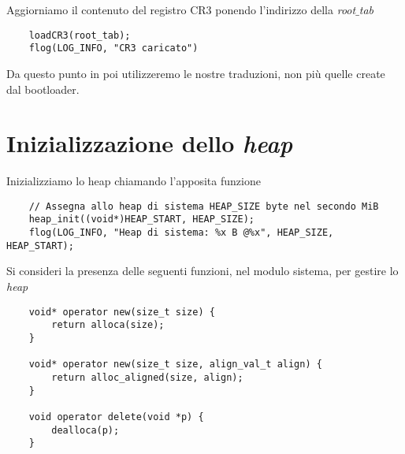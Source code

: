 Aggiorniamo il contenuto del registro CR3 ponendo l'indirizzo della \emph{root$\_$tab}
\begin{verbatim}
	loadCR3(root_tab);
	flog(LOG_INFO, "CR3 caricato")
\end{verbatim}
Da questo punto in poi utilizzeremo le nostre traduzioni, non più quelle create dal bootloader.

\clearpage 

\section{Inizializzazione dello \emph{heap}}
Inizializziamo lo heap chiamando l'apposita funzione
\small 
\begin{verbatim}
	// Assegna allo heap di sistema HEAP_SIZE byte nel secondo MiB
	heap_init((void*)HEAP_START, HEAP_SIZE);
	flog(LOG_INFO, "Heap di sistema: %x B @%x", HEAP_SIZE, HEAP_START);
\end{verbatim}
\normalsize 
Si consideri la presenza delle seguenti funzioni, nel modulo sistema, per gestire lo \emph{heap}
\begin{verbatim}
	void* operator new(size_t size) {
		return alloca(size);
	}
	
	void* operator new(size_t size, align_val_t align) {
		return alloc_aligned(size, align);
	}
	
	void operator delete(void *p) {
		dealloca(p);
	}
\end{verbatim}
